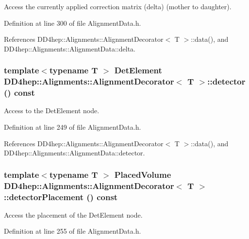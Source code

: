 Access the currently applied correction matrix (delta) (mother to daughter). 

Definition at line 300 of file AlignmentData.h.

References DD4hep::Alignments::AlignmentDecorator$<$ T $>$::data(), and DD4hep::Alignments::AlignmentData::delta.\hypertarget{class_d_d4hep_1_1_alignments_1_1_alignment_decorator_a3b5cdf201d75aa7a02755608e168918f}{
\subsubsection[{detector}]{\setlength{\rightskip}{0pt plus 5cm}template$<$typename T $>$ {\bf DetElement} {\bf DD4hep::Alignments::AlignmentDecorator}$<$ {\bf T} $>$::detector () const}}
\label{class_d_d4hep_1_1_alignments_1_1_alignment_decorator_a3b5cdf201d75aa7a02755608e168918f}


Access to the DetElement node. 

Definition at line 249 of file AlignmentData.h.

References DD4hep::Alignments::AlignmentDecorator$<$ T $>$::data(), and DD4hep::Alignments::AlignmentData::detector.\hypertarget{class_d_d4hep_1_1_alignments_1_1_alignment_decorator_a3878365e8537a2f1052c9b34b187c4e7}{
\subsubsection[{detectorPlacement}]{\setlength{\rightskip}{0pt plus 5cm}template$<$typename T $>$ {\bf PlacedVolume} {\bf DD4hep::Alignments::AlignmentDecorator}$<$ {\bf T} $>$::detectorPlacement () const}}
\label{class_d_d4hep_1_1_alignments_1_1_alignment_decorator_a3878365e8537a2f1052c9b34b187c4e7}


Access the placement of the DetElement node. 

Definition at line 255 of file AlignmentData.h.

